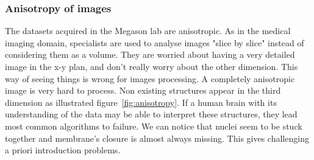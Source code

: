 \subsubsection{Anisotropy of images}

The datasets acquired in the Megason lab are anisotropic. As in the medical imaging domain, specialists are used to analyse images "slice by slice"
instead of considering them as a volume. They are worried about having a very detailed image in the x-y plan, and don't really worry about the other dimension.
This way of seeing things is wrong for images processing. A completely anisotropic image is very hard to process.
Non existing structures appear in the third dimension as illustrated figure~\ref{fig:anisotropy}.
If a human brain with its understanding of the data may be able to interpret these structures, they lead most common algorithms to failure.
We can notice that nuclei seem to be stuck together and membrane's closure is almost always missing. This gives challenging a priori introduction problems.

